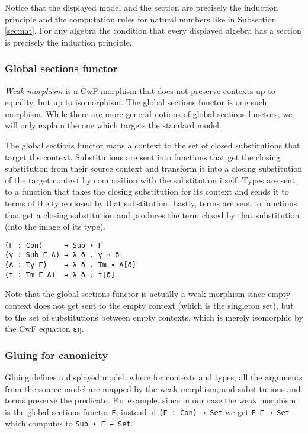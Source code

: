 Notice that the displayed model and the section are precisely the induction principle and the computation rules for natural numbers like in Subsection \ref{sec:nat}. For any algebra the condition that every displayed algebra has a section is precisely the induction principle.

\subsubsection{Global sections functor}

\emph{Weak morphism} is a CwF-morphism that does not preserve contexts up to equality, but up to isomorphism. The global sections functor is one such morphism. While there are more general notions of global sections functors, we will only explain the one which targets the standard model.

The global sections functor maps a context to the set of closed substitutions that target the context. Substitutions are sent into functions that get the closing substitution from their source context and transform it into a closing substitution of the target context by composition with the substitution itself. Types are sent to a function that takes the closing substitution for its context and sends it to terms of the type closed by that substitution. Lastly, terms are sent to functions that get a closing substitution and produces the term closed by that substitution (into the image of its type).

\begin{verbatim}
(Γ : Con)     → Sub ∙ Γ
(γ : Sub Γ Δ) → λ δ . γ ∘ δ
(A : Ty Γ)    → λ δ . Tm ∙ A[δ]
(t : Tm Γ A)  → λ δ . t[δ]
\end{verbatim}

Note that the global sections functor is actually a weak morphism since empty context does not get sent to the empty context (which is the singleton set), but to the set of substitutions between empty contexts, which is merely isomorphic by the CwF equation \texttt{εη}.

\subsubsection{Gluing for canonicity}

Gluing defines a displayed model, where for contexts and types, all the arguments from the source model are mapped by the weak morphism, and substitutions and terms preserve the predicate. For example, since in our case the weak morphism is the global sections functor \texttt{F}, instead of \texttt{(Γ : Con) → Set} we get \texttt{F Γ → Set} which computes to \texttt{Sub ∙ Γ → Set}.

